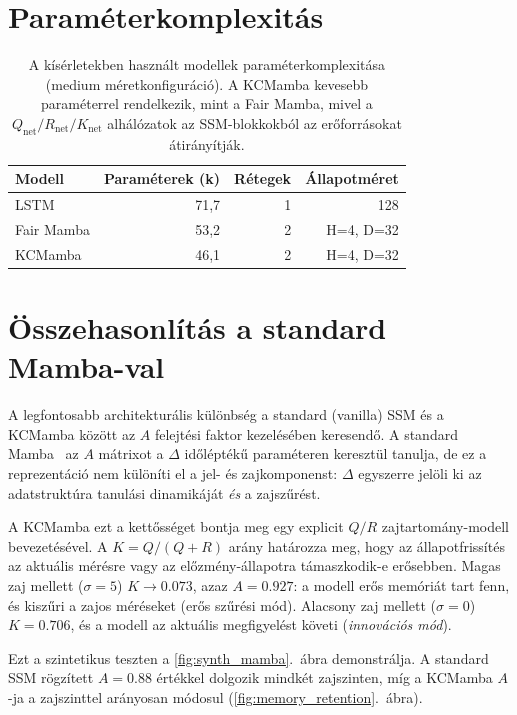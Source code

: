 \section{Paraméterkomplexitás}

\begin{table}[H]
    \centering
    \begin{tabular}{|l|r|r|r|}
        \hline
        \textbf{Modell} & \textbf{Paraméterek (k)} & \textbf{Rétegek} & \textbf{Állapotméret} \\
        \hline\hline
        LSTM            & 71{,}7 & 1 & 128 \\
        Fair Mamba      & 53{,}2 & 2 & H=4, D=32 \\
        KCMamba       & 46{,}1 & 2 & H=4, D=32 \\
        \hline
    \end{tabular}
    \caption{A kísérletekben használt modellek paraméterkomplexitása
             (medium méretkonfiguráció). A KCMamba kevesebb paraméterrel
             rendelkezik, mint a Fair Mamba, mivel a $Q_\text{net}/R_\text{net}/K_\text{net}$
             alhálózatok az SSM-blokkokból az erőforrásokat átirányítják.}
    \label{tab:params}
\end{table}

\newpage
\section{Összehasonlítás a standard Mamba-val}

A legfontosabb architekturális különbség a standard (vanilla) SSM és
a KCMamba között az $A$ felejtési faktor kezelésében keresendő.
A standard Mamba~\cite{gu2023mamba} az $A$ mátrixot a $\Delta$ időléptékű
paraméteren keresztül tanulja, de ez a reprezentáció nem különíti el a
jel- és zajkomponenst: $\Delta$ egyszerre jelöli ki az adatstruktúra
tanulási dinamikáját \emph{és} a zajszűrést.

A KCMamba ezt a kettősséget bontja meg egy explicit $Q/R$
zajtartomány-modell bevezetésével.
A $K = Q/(Q+R)$ arány határozza meg, hogy az állapotfrissítés az
aktuális mérésre vagy az előzmény-állapotra támaszkodik-e erősebben.
Magas zaj mellett ($\sigma=5$) $K \to 0.073$, azaz $A = 0.927$: a modell
erős memóriát tart fenn, és kiszűri a zajos méréseket
(erős szűrési mód).
Alacsony zaj mellett ($\sigma=0$) $K = 0.706$, és a modell az aktuális
megfigyelést követi (\emph{innovációs mód}).

Ezt a szintetikus teszten a \ref{fig:synth_mamba}.\ ábra demonstrálja.
A standard SSM rögzített $A=0.88$ értékkel dolgozik mindkét zajszinten,
míg a KCMamba $A$-ja a zajszinttel arányosan módosul (\ref{fig:memory_retention}.\ ábra).

